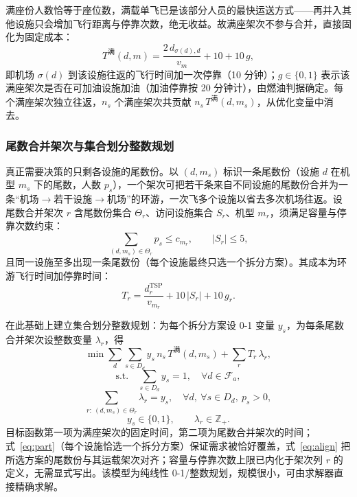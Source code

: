 \documentclass[UTF8,zihao=-4]{ctexart}
\numberwithin{figure}{section}
\numberwithin{table}{section}
\begin{document}
满座份人数恰等于座位数，满载单飞已是该部分人员的最快运送方式——再并入其他设施只会增加飞行距离与停靠次数，绝无收益。故满座架次不参与合并，直接固化为固定成本：
\begin{equation}
  T^{\text{满}}(d,m)=\frac{2\,d_{\sigma(d),d}}{v_m}+10+10\,g,
\end{equation}
即机场 $\sigma(d)$ 到该设施往返的飞行时间加一次停靠（10 分钟）；$g\in\{0,1\}$ 表示该满座架次是否在可加油设施加油（加油停靠按 20 分钟计），由燃油判据确定。每个满座架次独立往返，$n_s$ 个满座架次共贡献 $n_s\,T^{\text{满}}(d,m_s)$，从优化变量中消去。

\subsubsection{尾数合并架次与集合划分整数规划}

真正需要决策的只剩各设施的尾数份。以 $(d,m_s)$ 标识一条尾数份（设施 $d$ 在机型 $m_s$ 下的尾数，人数 $p_s$），一个架次可把若干条来自不同设施的尾数份合并为一条“机场$\to$若干设施$\to$机场”的环游，一次飞多个设施以省去多次机场往返。设尾数合并架次 $r$ 含尾数份集合 $\Theta_r$、访问设施集合 $S_r$、机型 $m_r$，须满足容量与停靠次数约束：
\begin{equation}
  \sum_{(d,m_s)\in\Theta_r} p_s \le c_{m_r},\qquad |S_r|\le 5,
\end{equation}
且同一设施至多出现一条尾数份（每个设施最终只选一个拆分方案）。其成本为环游飞行时间加停靠时间：
\begin{equation}
  T_r=\frac{d_r^{\mathrm{TSP}}}{v_{m_r}}+10\,|S_r|+10\,g_r.
\end{equation}

在此基础上建立集合划分整数规划：为每个拆分方案设 0-1 变量 $y_s$，为每条尾数合并架次设整数变量 $\lambda_r$，得
\begin{equation}
  \min \sum_{d}\sum_{s\in D_d} y_s\,n_s\,T^{\text{满}}(d,m_s)+\sum_{r}T_r\,\lambda_r,\label{eq:obj}
\end{equation}
\begin{equation}
  \text{s.t.}\quad \sum_{s\in D_d} y_s=1,\quad \forall d\in\mathcal{F}_a,\label{eq:part}
\end{equation}
\begin{equation}
  \sum_{r:\ (d,m_s)\in\Theta_r}\lambda_r = y_s,\quad \forall d,\ \forall s\in D_d,\ p_s>0,\label{eq:align}
\end{equation}
\begin{equation}
  y_s\in\{0,1\},\qquad \lambda_r\in\mathbb{Z}_+.\label{eq:lambda}
\end{equation}
目标函数第一项为满座架次的固定时间，第二项为尾数合并架次的时间；式~\eqref{eq:part}（每个设施恰选一个拆分方案）保证需求被恰好覆盖，式~\eqref{eq:align} 把所选方案的尾数份与其运载架次对齐；容量与停靠次数上限已内化于架次列 $r$ 的定义，无需显式写出。该模型为纯线性 0-1/整数规划，规模很小，可由求解器直接精确求解。
\end{document}
